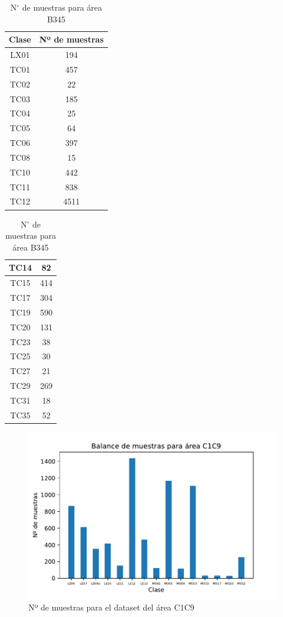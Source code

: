 \begin{table}[H]
	\centering
	\begin{tabular}{|c|c|}
		\hline
		Clase & Nº de muestras \\ \hline
		LX01 & 194 \\ \hline
		TC01 & 457 \\ \hline
		TC02 & 22 \\ \hline
		TC03 & 185 \\ \hline
		TC04 & 25 \\ \hline
		TC05 & 64 \\ \hline
		TC06 & 397 \\ \hline
		TC08 & 15 \\ \hline
		TC10 & 442 \\ \hline
		TC11 & 838 \\ \hline
		TC12 & 4511 \\ \hline
	\end{tabular}
	\begin{tabular}{|c|c|}
		\hline	
		TC14 & 82 \\ \hline
		TC15 & 414 \\ \hline
		TC17 & 304 \\ \hline
		TC19 & 590 \\ \hline
		TC20 & 131 \\ \hline
		TC23 & 38 \\ \hline
		TC25 & 30 \\ \hline
		TC27 & 21 \\ \hline
		TC29 & 269 \\ \hline
		TC31 & 18 \\ \hline
		TC35 & 52 \\ \hline
	\end{tabular}
	\caption{N$^\circ$ de muestras para área B345}	
	\label{tab:n_muestras_b345}
\end{table}

\begin{figure}[H]
	\centering
	\captionsetup{justification=centering}
	\includegraphics[width=\textwidth]{imagenes/resultados/balance/C1C9.pdf}
	\caption{Nº de muestras para el dataset del área C1C9}
	\label{fig:frecuencia_dataset_c1c9}
\end{figure}


